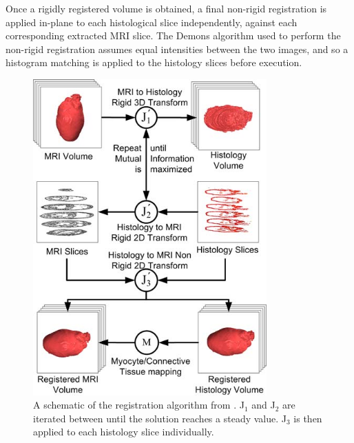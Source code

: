      Once a rigidly registered volume is obtained, a final non-rigid registration is applied in-plane to each histological slice independently, against each corresponding extracted MRI slice. The Demons algorithm used to perform the non-rigid registration assumes equal intensities between the two images, and so a histogram  matching is applied to the histology slices before execution.
            
      \begin{figure}[htbp]
        \centering
        \includegraphics[width=0.8\textwidth]{Ch6/Figs/algorithm}
        \caption{A schematic of the registration algorithm from \cite{Mansoori:2007p221}. J$_1$ and J$_2$ are iterated between until the solution reaches a steady value. J$_3$ is then applied to each histology slice individually.}
        \label{fig:algorithm}
      \end{figure}

